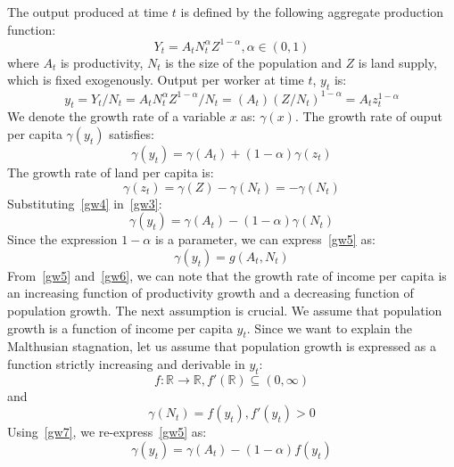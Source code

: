 \documentclass[12pt]{article}%
\begin{document}
The output produced at time $t$ is defined by the following aggregate production function:
\begin{equation}\label{gw1}
    Y_{t}=A_{t}N^{\alpha}_{t}Z^{1-\alpha}, \alpha\in(0,1)
\end{equation}
where $A_{t}$ is productivity, $N_{t}$ is the size of the population and $Z$ is land supply, which is fixed exogenously.
Output per worker at time $t$, $y_{t}$ is:
\begin{equation}\label{gw2}
    y_{t}=Y_{t}/N_{t}=A_{t}N^{\alpha}_{t}Z^{1-\alpha}/N_{t}=(A_{t})(Z/N_{t})^{1-\alpha}=A_{t}z^{1-\alpha}_{t}
\end{equation}
We denote the growth rate of a variable $x$ as: $\gamma(x)$. The growth rate of ouput per capita $\gamma(y_{t})$ satisfies:
\begin{equation}\label{gw3}
\gamma(y_{t})=\gamma(A_{t})+(1-\alpha)\gamma(z_{t})
\end{equation}
The growth rate of land per capita is:
\begin{equation}\label{gw4}
\gamma(z_{t})=\gamma(Z)-\gamma(N_{t})=-\gamma(N_{t})
\end{equation}
Substituting~\ref{gw4} in~\ref{gw3}:
\begin{equation}\label{gw5}
\gamma(y_{t})=\gamma(A_{t})-(1-\alpha)\gamma(N_{t})
\end{equation}
Since the expression $1-\alpha$ is a parameter, we can express~\ref{gw5} as:
\begin{equation}\label{gw6}
\gamma(y_{t})=g(A_{t},N_{t})
\end{equation}
From~\ref{gw5} and~\ref{gw6}, we can note that the growth rate of income per capita is an increasing function of productivity growth and a decreasing function of population growth. The next assumption is crucial. We assume that population growth is a function of income per capita $y_{t}$. Since we want to explain the Malthusian stagnation, let us assume that population growth is expressed as a function strictly increasing and derivable in $y_{t}$:
\begin{equation}\label{detail1}
f:\mathbb{R}\longrightarrow\mathbb{R}, f'(\mathbb{R})\subseteq(0,\infty)
\end{equation}
and
\begin{equation}\label{gw7}
\gamma(N_{t})=f(y_{t}), f'(y_{t})>0
\end{equation}
Using~\ref{gw7}, we re-express~\ref{gw5} as:
\begin{equation}\label{gw8}
\gamma(y_{t})=\gamma(A_{t})-(1-\alpha)f(y_{t})
\end{equation}
\end{document}

